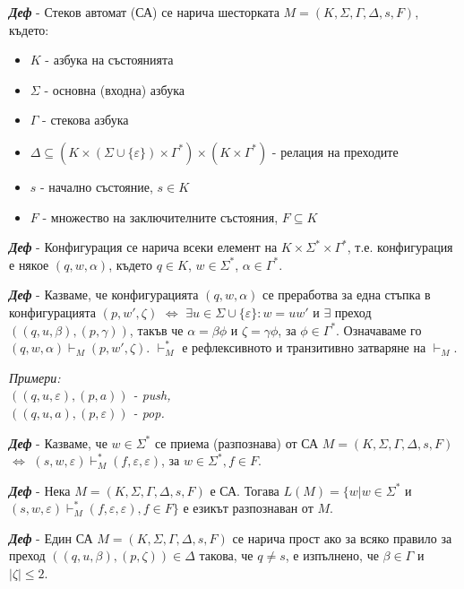 \documentclass[fleqn,12pt]{article}
\begin{document}
\begin{flushleft}
\textit{\textbf{Деф}} - Стеков автомат (СА) се нарича шесторката $M = (K, \Sigma, \Gamma, \Delta, s, F)$, където:
\begin{itemize}
    \item $K$ - азбука на състоянията
    \item $\Sigma$ - основна (входна) азбука
    \item $\Gamma$ - стекова азбука
    \item $\Delta \subseteq (K \times (\Sigma \cup \{\varepsilon\}) \times \Gamma^*) \times (K \times \Gamma^*)$ - релация на преходите
    \item $s$ - начално състояние, $s \in K$
    \item $F$ - множество на заключителните състояния, $F \subseteq K$
\end{itemize}

\textit{\textbf{Деф}} - Конфигурация се нарича всеки елемент на $K \times \Sigma^* \times \Gamma^*$, т.е. конфигурация е някое $(q, w, \alpha)$, където $q \in K$, $w \in \Sigma^*$, $\alpha \in \Gamma^*$.

\textit{\textbf{Деф}} - Казваме, че конфигурацията $(q, w, \alpha)$ се преработва за една стъпка в конфигурацията $(p, w', \zeta)$ $\iff$ $\exists u \in \Sigma \cup \{\varepsilon\}: w=uw'$ и $\exists$ преход $((q, u, \beta), (p, \gamma))$, 
такъв че $\alpha = \beta\phi$ и $\zeta = \gamma\phi$, за $\phi \in \Gamma^*$. Означаваме го $(q, w, \alpha) \vdash_M (p, w', \zeta)$. $\vdash_M^*$ е рефлексивното и транзитивно затваряне на $\vdash_M$.

\textit{Примери:\\
$((q, u, \varepsilon), (p, a))$ - push, \\
$((q, u, a), (p, \varepsilon))$ - pop.
}

\textit{\textbf{Деф}} - Казваме, че $w \in \Sigma^*$ се приема (разпознава) от СА $M = (K, \Sigma, \Gamma, \Delta, s, F)$ $\iff$ $(s, w, \varepsilon) \vdash_M^* (f, \varepsilon, \varepsilon)$, за $w \in \Sigma^*, f \in F$.

\textit{\textbf{Деф}} - Нека $M = (K, \Sigma, \Gamma, \Delta, s, F)$ е СА. Тогава $L(M) = \{w | w \in \Sigma^*$ и $ (s, w, \varepsilon) \vdash_M^* (f, \varepsilon, \varepsilon), f \in F\}$ е езикът разпознаван от $M$.

\textit{\textbf{Деф}} - Един СА $M = (K, \Sigma, \Gamma, \Delta, s, F)$ се нарича прост ако за всяко правило за преход $((q, u, \beta), (p, \zeta)) \in \Delta$ такова, че $q \neq s$, е изпълнено, че $\beta \in \Gamma$ и $|\zeta| \leq 2$.


\end{flushleft}
\end{document}
